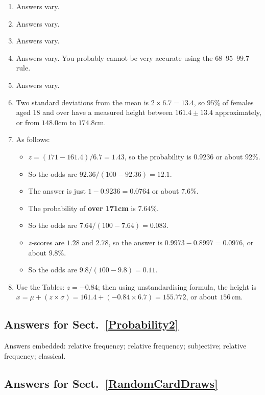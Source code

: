 \documentclass[
  11pt,
  a4paper,
  krantz2]{krantz}
\providecommand{\tightlist}{%
  \setlength{\itemsep}{0pt}\setlength{\parskip}{0pt}}
\begin{document}
\begin{footnotesize}
\begin{enumerate}
\def\labelenumi{\arabic{enumi}.}
\tightlist
\item
  Answers vary.
\item
  Answers vary.
\item
  Answers vary.
\item
  Answers vary.
  You probably cannot be very accurate using the \(68\)--\(95\)--\(99.7\) rule.
\item
  Answers vary.
\item
  Two standard deviations from the mean is \(2\times 6.7 = 13.4\), so \(95\)\% of females aged \(18\) and over have a measured height
  between \(161.4 \pm13.4\) approximately, or from \(148.0\)cm to \(174.8\)cm.
\item
  As follows:

  \begin{itemize}
  \tightlist
  \item
    \(z = (171 - 161.4)/6.7 = 1.43\), so the probability is \(0.9236\) or about \(92\)\%.
  \item
    So the odds are \(92.36/(100 - 92.36) = 12.1\).
  \item
    The answer is just \(1 - 0.9236 = 0.0764\) or about \(7.6\)\%.
  \item
    The probability of \textbf{over 171cm} is \(7.64\)\%.
  \item
    So the odds are \(7.64/(100 - 7.64)= 0.083\).
  \item
    \(z\)-scores are \(1.28\) and \(2.78\), so the answer is \(0.9973 - 0.8997 = 0.0976\), or about \(9.8\)\%.
  \item
    So the odds are \(9.8/(100 - 9.8) = 0.11\).
  \end{itemize}
\item
  Use the Tables: \(z = -0.84\); then using unstandardising formula, the height is \(x = \mu + (z\times\sigma) = 161.4 + (-0.84\times6.7) = 155.772\), or about \(156\,\text{cm}\).
\end{enumerate}

\subsection*{Answers for Sect.~\ref{Probability2}}\label{answers-for-sect.-refprobability2}

Answers embedded:
relative frequency;
relative frequency;
subjective;
relative frequency;
classical.

\subsection*{Answers for Sect.~\ref{RandomCardDraws}}\label{answers-for-sect.-refrandomcarddraws}


\end{footnotesize}
\end{document}
